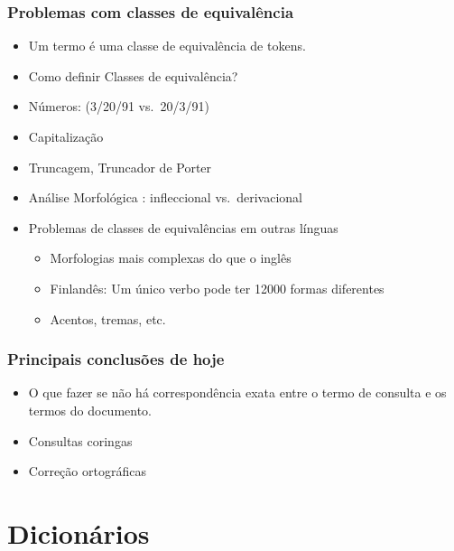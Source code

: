\documentclass[compress]{beamer}
\begin{document}
\begin{frame}
\frametitle{Problemas com classes de equivalência}
\begin{itemize}
\item Um termo é uma classe de equivalência de tokens.
\item Como definir Classes de equivalência?
\item Números: (3/20/91 vs.\ 20/3/91)
\item Capitalização
\item Truncagem, Truncador de Porter 
\item Análise Morfológica : infleccional vs.\ derivacional
\item Problemas de classes de equivalências em outras línguas
\begin{itemize}
\item Morfologias mais complexas do que o inglês
\item Finlandês: Um único verbo pode ter 12000 formas diferentes
\item Acentos, tremas, etc.
\end{itemize}
\end{itemize}
\end{frame}

\begin{frame}[label=takeaway]
\frametitle{Principais conclusões de hoje}

\begin{itemize}

\pause[2]

\item {} O que fazer se não há correspondência 
exata entre o termo de consulta e os termos do documento.

\pause[3]

\item Consultas coringas

\pause[4]

\item Correção ortográficas

\end{itemize}

\end{frame}

\section{Dicionários}
\end{document}
